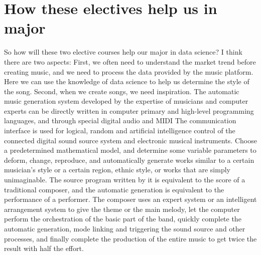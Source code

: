 \documentclass{article}
\begin{document}
\section{How these electives help us in major}
So how will these two elective courses help our major in data science? I think there are two aspects: First, we often need to understand the market trend before creating music, and we need to process the data provided by the music platform. Here we can use the knowledge of data science to help us determine the style of the song. Second, when we create songs, we need inspiration. The automatic music generation system developed by the expertise of musicians and computer experts can be directly written in computer primary and high-level programming languages, and through special digital audio and MIDI The communication interface is used for logical, random and artificial intelligence control of the connected digital sound source system and electronic musical instruments. Choose a predetermined mathematical model, and determine some variable parameters to deform, change, reproduce, and automatically generate works similar to a certain musician's style or a certain region, ethnic style, or works that are simply unimaginable. The source program written by it is equivalent to the score of a traditional composer, and the automatic generation is equivalent to the performance of a performer. The composer uses an expert system or an intelligent arrangement system to give the theme or the main melody, let the computer perform the orchestration of the basic part of the band, quickly complete the automatic generation, mode linking and triggering the sound source and other processes, and finally complete the production of the entire music to get twice the result with half the effort. 
\end{document}
